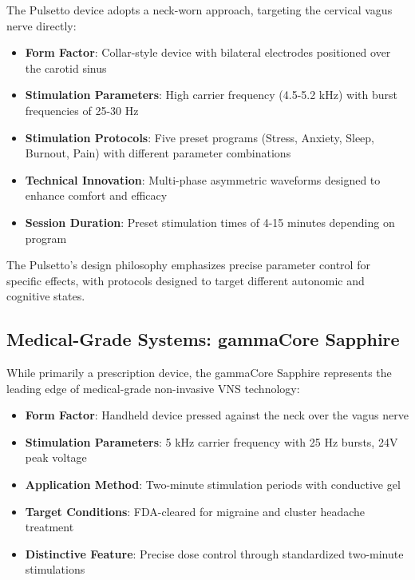 \documentclass[
  Letterpaper,
]{scrbook}
\providecommand{\tightlist}{%
  \setlength{\itemsep}{0pt}\setlength{\parskip}{0pt}}\usepackage{longtable,booktabs,array}
\begin{document}
The Pulsetto device adopts a neck-worn approach, targeting the cervical
vagus nerve directly:

\begin{itemize}
\tightlist
\item
  \textbf{Form Factor}: Collar-style device with bilateral electrodes
  positioned over the carotid sinus
\item
  \textbf{Stimulation Parameters}: High carrier frequency (4.5-5.2 kHz)
  with burst frequencies of 25-30 Hz
\item
  \textbf{Stimulation Protocols}: Five preset programs (Stress, Anxiety,
  Sleep, Burnout, Pain) with different parameter combinations
\item
  \textbf{Technical Innovation}: Multi-phase asymmetric waveforms
  designed to enhance comfort and efficacy
\item
  \textbf{Session Duration}: Preset stimulation times of 4-15 minutes
  depending on program
\end{itemize}

The Pulsetto's design philosophy emphasizes precise parameter control
for specific effects, with protocols designed to target different
autonomic and cognitive states.

\subsection{Medical-Grade Systems: gammaCore
Sapphire}\label{medical-grade-systems-gammacore-sapphire}

While primarily a prescription device, the gammaCore Sapphire represents
the leading edge of medical-grade non-invasive VNS technology:

\begin{itemize}
\tightlist
\item
  \textbf{Form Factor}: Handheld device pressed against the neck over
  the vagus nerve
\item
  \textbf{Stimulation Parameters}: 5 kHz carrier frequency with 25 Hz
  bursts, 24V peak voltage
\item
  \textbf{Application Method}: Two-minute stimulation periods with
  conductive gel
\item
  \textbf{Target Conditions}: FDA-cleared for migraine and cluster
  headache treatment
\item
  \textbf{Distinctive Feature}: Precise dose control through
  standardized two-minute stimulations
\end{itemize}
\end{document}
